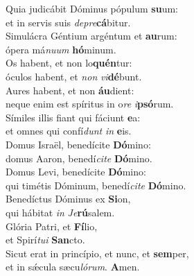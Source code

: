 \evenverse Quia judicábit Dóminus pópulum \textbf{su}um:~\*\\
\evenverse et in servis suis \textit{de}\textit{pre}\textbf{cá}bitur.\\
\oddverse Simulácra Géntium argéntum et \textbf{au}rum:~\*\\
\oddverse ópera má\textit{nu}\textit{um} \textbf{hó}minum.\\
\evenverse Os habent, et non lo\textbf{quén}tur:~\*\\
\evenverse óculos habent, et \textit{non} \textit{vi}\textbf{dé}bunt.\\
\oddverse Aures habent, et non \textbf{áu}dient:~\*\\
\oddverse neque enim est spíritus in o\textit{re} \textit{i}\textbf{psó}rum.\\
\evenverse Símiles illis fiant qui fáciunt \textbf{e}a:~\*\\
\evenverse et omnes qui confí\textit{dunt} \textit{in} \textbf{e}is.\\
\oddverse Domus Israël, benedícite \textbf{Dó}mino:~\*\\
\oddverse domus Aaron, benedí\textit{ci}\textit{te} \textbf{Dó}mino.\\
\evenverse Domus Levi, benedícite \textbf{Dó}mino:~\*\\
\evenverse qui timétis Dóminum, benedí\textit{ci}\textit{te} \textbf{Dó}mino.\\
\oddverse Benedíctus Dóminus ex \textbf{Si}on,~\*\\
\oddverse qui hábitat \textit{in} \textit{Je}\textbf{rú}salem.\\
\evenverse Glória Patri, et \textbf{Fí}lio,~\*\\
\evenverse et Spirí\textit{tu}\textit{i} \textbf{San}cto.\\
\oddverse Sicut erat in princípio, et nunc, et \textbf{sem}per,~\*\\
\oddverse et in sǽcula sæcu\textit{ló}\textit{rum}. \textbf{A}men.\\
